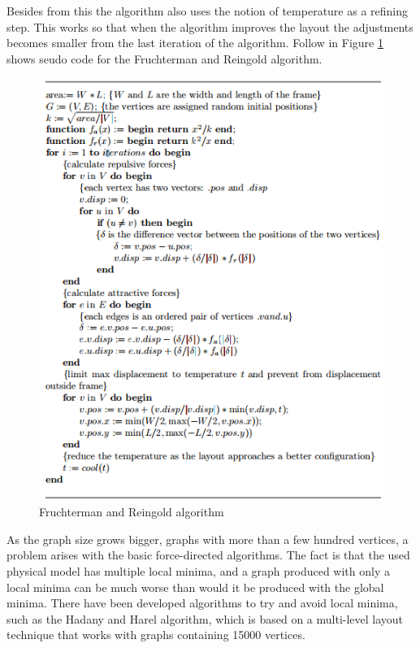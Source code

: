 \documentclass[a4paper,11pt]{kth-mag}
\begin{document}
Besides from this the algorithm also uses the notion of temperature as a refining step. This works so that when the algorithm improves the layout the adjustments becomes smaller from the last iteration of the algorithm. Follow
in Figure \ref{fig:FR} shows seudo code for the Fruchterman and Reingold algorithm.
\begin{figure}[!htbp]
	\centering
	\includegraphics{FR}
	\caption{Fruchterman and Reingold algorithm}
	\label{fig:FR}
\end{figure}
 
As the graph size grows bigger, graphs with more than a few hundred vertices, a problem arises with the basic force-directed algorithms. The fact is that the used physical model has multiple local minima, and a graph produced
with only a local minima can be much worse than would it be produced with the global minima. There have been developed algorithms to try and avoid local minima, such as the Hadany and Harel algorithm\cite{handh}, which is based on
a multi-level layout technique that works with graphs containing 15000 vertices. 
\end{document}
